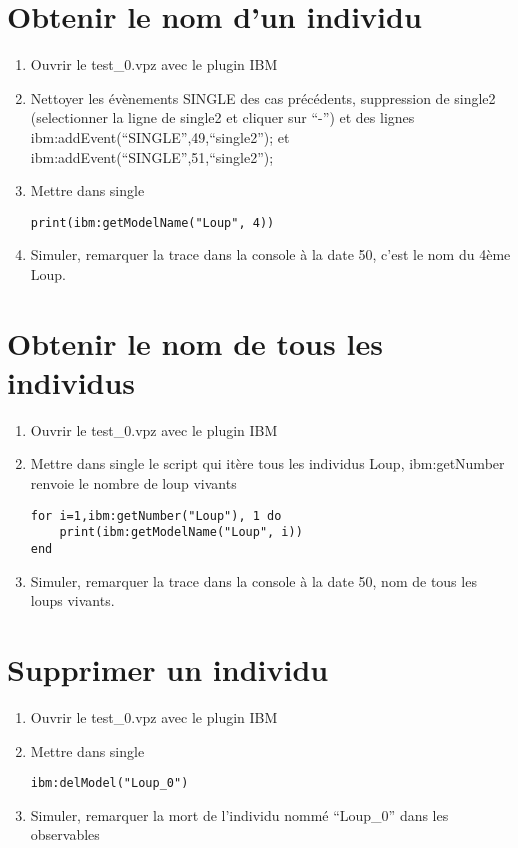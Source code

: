 \documentclass[a4paper,11pt,final]{article}
\begin{document}
\section{Obtenir le nom d'un individu}
\begin{enumerate}
\item Ouvrir le test\_0.vpz avec le plugin IBM 
\item Nettoyer les évènements SINGLE des cas précédents, suppression de single2 (selectionner la ligne de single2 et cliquer sur ``-'') et des lignes ibm\string:addEvent(``SINGLE'',49,``single2''); et ibm\string:addEvent(``SINGLE'',51,``single2'');
\item Mettre dans single
\begin{lstlisting}[frame=single]
print(ibm:getModelName("Loup", 4))
	\end{lstlisting} 
\item Simuler, remarquer la trace dans la console à la date 50, c'est le nom du 4ème Loup.
\end{enumerate}

\section{Obtenir le nom de tous les individus}
\begin{enumerate}
	\item Ouvrir le test\_0.vpz avec le plugin IBM 
	\item Mettre dans single le script qui itère tous les individus Loup, ibm\string:getNumber renvoie le nombre de loup vivants
	\begin{lstlisting}[frame=single]
for i=1,ibm:getNumber("Loup"), 1 do 
	print(ibm:getModelName("Loup", i))
end
		\end{lstlisting} 
	\item Simuler, remarquer la trace dans la console à la date 50, nom de tous les loups vivants.
\end{enumerate}

\section{Supprimer un individu}
\begin{enumerate}
	\item Ouvrir le test\_0.vpz avec le plugin IBM 
	\item Mettre dans single
	\begin{lstlisting}[frame=single]
ibm:delModel("Loup_0")
		\end{lstlisting} 
	\item Simuler, remarquer la mort de l'individu nommé ``Loup\_0'' dans les observables
\end{enumerate}
\end{document}
